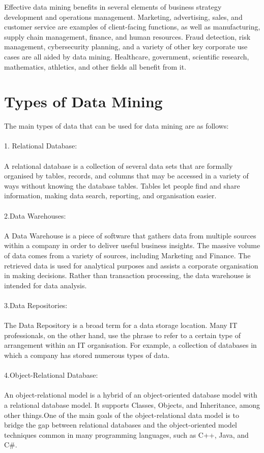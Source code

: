 \documentclass[12pt,letterpaper]{article}
\begin{document}
Effective data mining benefits in several elements of business strategy development and operations management. Marketing, advertising, sales, and customer service are examples of client-facing functions, as well as manufacturing, supply chain management, finance, and human resources. Fraud detection, risk management, cybersecurity planning, and a variety of other key corporate use cases are all aided by data mining. Healthcare, government, scientific research, mathematics, athletics, and other fields all benefit from it.
\section{Types of Data Mining}
The main types of data that can be used for data mining are as follows:\\
\\
1. Relational Database:\\
\\
A relational database is a collection of several data sets that are formally organised by tables, records, and columns that may be accessed in a variety of ways without knowing the database tables. Tables let people find and share information, making data search, reporting, and organisation easier.\\
\\
2.Data Warehouses:\\
\\
A Data Warehouse is a piece of software that gathers data from multiple sources within a company in order to deliver useful business insights. The massive volume of data comes from a variety of sources, including Marketing and Finance. The retrieved data is used for analytical purposes and assists a corporate organisation in making decisions. Rather than transaction processing, the data warehouse is intended for data analysis.\\
\\
3.Data Repositories:\\
\\
The Data Repository is a broad term for a data storage location. Many IT professionals, on the other hand, use the phrase to refer to a certain type of arrangement within an IT organisation. For example, a collection of databases in which a company has stored numerous types of data.\\
\\
4.Object-Relational Database:\\
\\
An object-relational model is a hybrid of an object-oriented database model with a relational database model. It supports Classes, Objects, and Inheritance, among other things.One of the main goals of the object-relational data model is to bridge the gap between relational databases and the object-oriented model techniques common in many programming languages, such as C++, Java, and C#.\\
\\
\end{document}
